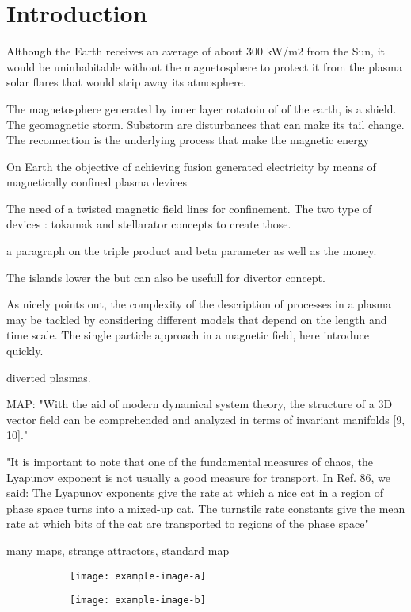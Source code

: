 
\cleardoublepage
\chapter*{Introduction}

Although the Earth receives an average of about 300 kW/m2 from the Sun, it would be uninhabitable without the magnetosphere to protect it from the plasma solar flares that would strip away its atmosphere. 

The magnetosphere generated by inner layer rotatoin of of the earth, is a shield. The geomagnetic storm. Substorm are disturbances that can make its tail change. The reconnection is the underlying process that make the magnetic energy 

On Earth the objective of achieving fusion generated electricity by means of magnetically confined plasma devices 

The need of a twisted magnetic field lines for confinement. The two type of devices : tokamak and stellarator concepts to create those.

a paragraph on the triple product and beta parameter as well as the money.

The islands lower the but can also be usefull for divertor concept.

As \cite{imbert-gerard_introduction_2020} nicely points out, the complexity of the description of processes in a plasma may be tackled by considering different models that depend on the length and time scale. The single particle approach in a magnetic field, here introduce quickly.

diverted plasmas.

MAP: "With the aid of modern dynamical system theory, the structure of a 3D vector field can be comprehended and analyzed in terms of invariant manifolds [9, 10]."

"It is important to note that one of the fundamental measures of chaos, the Lyapunov exponent is not usually a good measure for transport. In Ref. 86, we said: The Lyapunov exponents give the rate at which a nice cat in a region of phase space turns into a mixed-up cat. The turnstile rate constants give the mean rate at which bits of the cat are transported to regions of the phase space"

many maps, strange attractors, standard map

\begin{figure}[h!]
    \centering
    \begin{subfigure}[t]{0.49\textwidth}
        \centering
        \texttt{[image: example-image-a]}
        \caption{}
        \label{fig:}
    \end{subfigure}
    \hfill
    \begin{subfigure}[t]{0.49\textwidth}
        \centering
        \texttt{[image: example-image-b]}
        \caption{}
        \label{}
    \end{subfigure}
    \caption{}
    \label{}
\end{figure}

